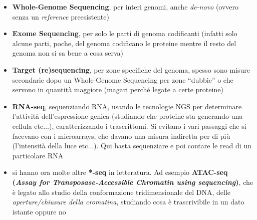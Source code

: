 \documentclass[a4paper,12pt, oneside]{book}
\begin{document}
\begin{itemize}
  \item \textbf{Whole-Genome Sequencing}, per interi genomi, anche
  \textit{de-novo} (ovvero senza un \textit{reference} preesistente)
  \item \textbf{Exome Sequencing}, per solo le parti di genoma codificanti
  (infatti solo alcune parti, poche, del genoma codificano le proteine mentre il
  resto del genoma non si sa bene a cosa serva)
  \item \textbf{Target (re)sequencing}, per zone specifiche del genoma, spesso
  sono misure secondarie dopo un Whole-Genome Sequencing per zone ``dubbie'' o
  che servono in quantità maggiore (magari perché legate a certe proteine)
  \item \textbf{RNA-seq}, sequenziando RNA, usando le tecnologie NGS per
  determinare l'attività dell'espressione genica (studiando che proteine sta
  generando una cellula etc$\ldots$), caratterizzando i trascrittomi. Si evitano
  i vari passaggi che si facevano con i microarrays, che davano una misura
  indiretta per di più (l'intensità della luce etc$\ldots$). Qui basta
  sequenziare e poi contare le read di un particolare RNA
  \item si hanno ora molte altre \textbf{*-seq} in letteratura. Ad esempio
  \textbf{ATAC-seq (\textit{Assay for Transposase-Accessible Chromatin using
      sequencing})}, che è legato allo studio della conformazione
  tridimensionale del DNA, delle \textit{aperture/chiusure della cromatina},
  studiando cosa è trascrivibile in un dato istante oppure no
\end{itemize}
\end{document}
